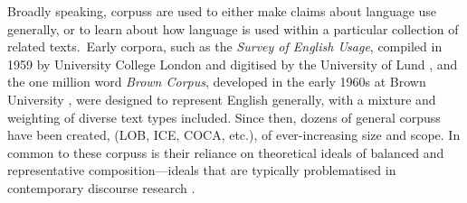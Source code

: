 Broadly speaking, \glspl{corpus} are used to either make claims about language use generally, or to learn about how language is used within a particular collection of related texts.~Early corpora, such as the \emph{Survey of English Usage}, compiled in 1959 by University College London and digitised by the University of Lund \cite{quirk_towards_1960}, and the one million word \emph{Brown Corpus}, developed in the early 1960s at Brown University \cite{meyer_english_2002}, were designed to represent English generally, with a mixture and weighting of diverse text types included. Since then, dozens of general \glspl{corpus} have been created, (LOB, ICE, COCA, etc.), of ever-increasing size and scope. In common to these \glspl{corpus} is their reliance on theoretical ideals of balanced and representative composition---ideals that are typically problematised in contemporary discourse research \cite{baker_acceptable_2012}.





